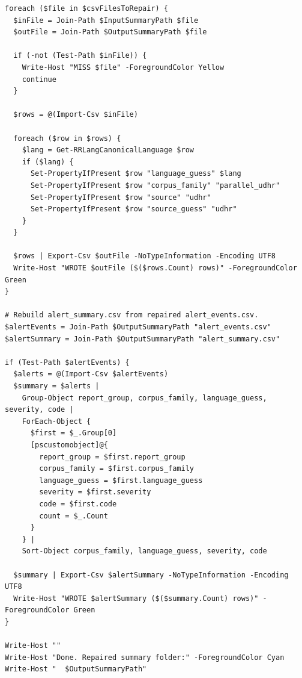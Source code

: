 \documentclass[11pt,a4paper]{article}
\begin{document}
\begin{lstlisting}
foreach ($file in $csvFilesToRepair) {
  $inFile = Join-Path $InputSummaryPath $file
  $outFile = Join-Path $OutputSummaryPath $file

  if (-not (Test-Path $inFile)) {
    Write-Host "MISS $file" -ForegroundColor Yellow
    continue
  }

  $rows = @(Import-Csv $inFile)

  foreach ($row in $rows) {
    $lang = Get-RRLangCanonicalLanguage $row
    if ($lang) {
      Set-PropertyIfPresent $row "language_guess" $lang
      Set-PropertyIfPresent $row "corpus_family" "parallel_udhr"
      Set-PropertyIfPresent $row "source" "udhr"
      Set-PropertyIfPresent $row "source_guess" "udhr"
    }
  }

  $rows | Export-Csv $outFile -NoTypeInformation -Encoding UTF8
  Write-Host "WROTE $outFile ($($rows.Count) rows)" -ForegroundColor Green
}

# Rebuild alert_summary.csv from repaired alert_events.csv.
$alertEvents = Join-Path $OutputSummaryPath "alert_events.csv"
$alertSummary = Join-Path $OutputSummaryPath "alert_summary.csv"

if (Test-Path $alertEvents) {
  $alerts = @(Import-Csv $alertEvents)
  $summary = $alerts |
    Group-Object report_group, corpus_family, language_guess, severity, code |
    ForEach-Object {
      $first = $_.Group[0]
      [pscustomobject]@{
        report_group = $first.report_group
        corpus_family = $first.corpus_family
        language_guess = $first.language_guess
        severity = $first.severity
        code = $first.code
        count = $_.Count
      }
    } |
    Sort-Object corpus_family, language_guess, severity, code

  $summary | Export-Csv $alertSummary -NoTypeInformation -Encoding UTF8
  Write-Host "WROTE $alertSummary ($($summary.Count) rows)" -ForegroundColor Green
}

Write-Host ""
Write-Host "Done. Repaired summary folder:" -ForegroundColor Cyan
Write-Host "  $OutputSummaryPath"
\end{lstlisting}
\end{document}
